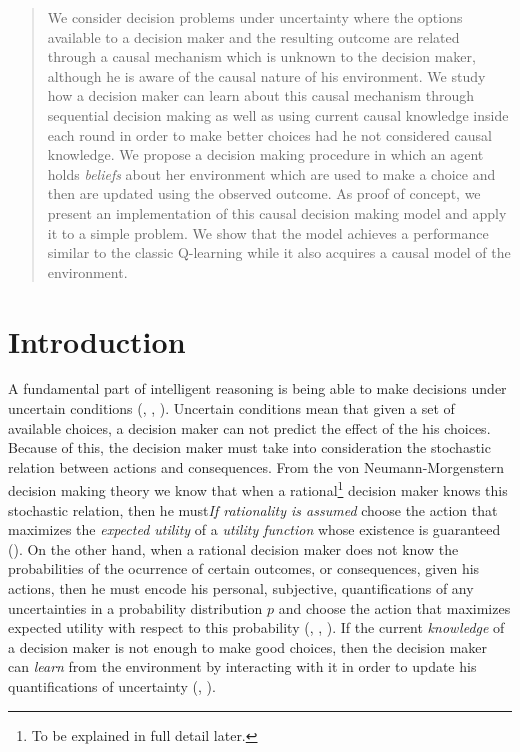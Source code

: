 \documentclass[english,letterpaper,12pt,final]{article}
\theoremstyle{definition}
\begin{document}

\singlespacing
\tableofcontents
\newpage
\begin{abstract}
We consider decision problems under uncertainty where the options available to a decision maker and the resulting outcome are related through a causal mechanism which is unknown to the decision maker, although he is aware of the causal nature of his environment. We study how a decision maker can learn about this causal mechanism through sequential decision making as well as using current causal knowledge inside each round in order to make better choices had he not considered causal knowledge. We propose a decision making procedure in which an agent holds \textit{beliefs} about her environment which are used to make a choice and then are updated using the observed outcome. As proof of concept, we present an implementation of this causal decision making model and apply it to a simple problem. We show that the model achieves a performance similar to the classic Q-learning while it also acquires a causal model of the environment. 
\end{abstract}
\section{Introduction}
\indent A fundamental part of intelligent reasoning is being able to make decisions under uncertain conditions (\cite{danks2014unifying}, \cite{lake2017building}, \cite{pearlwhy}). Uncertain conditions mean that given a set of available choices, a decision maker can not predict the effect of the his choices. Because of this, the decision maker must take into consideration the stochastic relation between actions and consequences. From the von Neumann-Morgenstern decision making theory we know that when a rational\footnote{To be explained in full detail later.} decision maker knows this stochastic relation, then he must\textit{If rationality is assumed} choose the action that maximizes the \textit{expected utility} of a \textit{utility function} whose existence is guaranteed (\cite{von1944theory}). On the other hand, when a rational decision maker does not know the probabilities of the ocurrence of certain outcomes, or consequences, given his actions, then he must encode his personal, subjective, quantifications of any uncertainties in a probability distribution $p$ and choose the action that maximizes expected utility with respect to this probability (\cite{savage1954the}, \cite{bernardo2000bayesian}, \cite{gilboa2009decision}). If the current \textit{knowledge} of a decision maker is not enough to make good choices, then the decision maker can \textit{learn} from the environment by interacting with it in order to update his quantifications of uncertainty (\cite{bernardo2000bayesian}, \cite{peterson2017introduction}).
\end{document}
